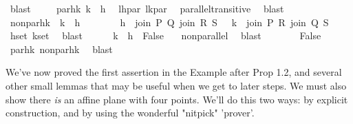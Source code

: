 \begin{isabellebody}
\ blast\ \isanewline
\isanewline
\ \ \isamarkupfalse%
\ par{\isacharunderscore}{\kern0pt}hk{\isacharcolon}{\kern0pt}\ {\isachardoublequoteopen}{\isacharparenleft}{\kern0pt}k\ {\isacharbar}{\kern0pt}{\isacharbar}{\kern0pt}\ h{\isacharparenright}{\kern0pt}{\isachardoublequoteclose}\ \isamarkupfalse%
\ lh{\isacharunderscore}{\kern0pt}par\ lk{\isacharunderscore}{\kern0pt}par\ \isamarkupfalse%
\ parallel{\isacharunderscore}{\kern0pt}transitive{}\ \isamarkupfalse%
\ blast\ \ \ \isanewline
\isanewline
\ \ \isamarkupfalse%
\ nonpar{\isacharunderscore}{\kern0pt}hk{\isacharcolon}{\kern0pt}\ {\isachardoublequoteopen}{\isasymnot}\ {\isacharparenleft}{\kern0pt}k\ {\isacharbar}{\kern0pt}{\isacharbar}{\kern0pt}\ h{\isacharparenright}{\kern0pt}{\isachardoublequoteclose}\ \isamarkupfalse%
\isanewline
\ \ \ \ \isamarkupfalse%
\ {}{\isacharcolon}{\kern0pt}\ {\isachardoublequoteopen}h\ {\isasymin}\ {\isacharbraceleft}{\kern0pt}join\ P\ Q{\isacharcomma}{\kern0pt}\ join\ R\ S{\isacharbraceright}{\kern0pt}\ {\isasymand}\ \ k\ {\isasymin}\ {\isacharbraceleft}{\kern0pt}join\ P\ R{\isacharcomma}{\kern0pt}\ join\ Q\ S{\isacharbraceright}{\kern0pt}{\isachardoublequoteclose}\ \isamarkupfalse%
\ hset\ kset\ \isamarkupfalse%
\ blast\isanewline
\ \ \ \ \isamarkupfalse%
\ {\isachardoublequoteopen}k\ {\isacharbar}{\kern0pt}{\isacharbar}{\kern0pt}\ h\ {\isasymLongrightarrow}\ False{\isachardoublequoteclose}\ \isamarkupfalse%
\ {}\ non{\isacharunderscore}{\kern0pt}parallel\ \isamarkupfalse%
\ blast\ \isanewline
\ \ \isamarkupfalse%
\isanewline
\ \ \isamarkupfalse%
\ False\ \isamarkupfalse%
\ par{\isacharunderscore}{\kern0pt}hk\ nonpar{\isacharunderscore}{\kern0pt}hk\ \isamarkupfalse%
\ blast\isanewline
{}\isamarkupfalse%
%
\endisatagproof
{\isafoldproof}%
%
\isadelimproof
%
\endisadelimproof
%
\begin{isamarkuptext}%
We've now proved the first assertion in the Example after Prop 1.2, and several other
small lemmas that may be useful when we get to later steps. We must also show there
\emph{is} an affine plane with four points. We'll do this two ways: by explicit construction, and
by using the wonderful "nitpick" 'prover'.%
\end{isamarkuptext}\isamarkuptrue%

\end{isabellebody}
